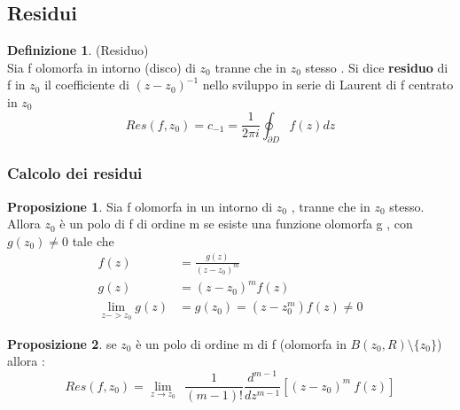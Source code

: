\documentclass{article}
\theoremstyle{definition}
\newtheorem*{definizione}{Definizione}
\newtheorem*{proposizione}{Proposizione}
\begin{document}
\subsection{Residui}
\begin{definizione}(Residuo) \\
	Sia f olomorfa in intorno (disco) di $z_0$ tranne che in $z_0$ stesso . Si dice \textbf{residuo} di f in $z_0$ il coefficiente di $(z-z_0)^{-1}$ nello sviluppo in serie di Laurent di f centrato in $z_0$ 
	$$Res(f,z_0)=c_{-1}=\frac{1}{2 \pi i}\oint_{\partial D}f(z)dz$$
\end{definizione}
	\subsubsection{Calcolo dei residui}
	\begin{tcolorbox}
	\begin{proposizione}
		Sia f olomorfa in un intorno di $z_0$ , tranne che in $z_0$ stesso. Allora $z_0$ è un polo di f di ordine m se esiste una funzione olomorfa g , con $g(z_0)\neq 0$ tale che 
		\begin{align*}
		f(z)&=\frac{g(z)}{(z-z_0)^m} \\
		g(z)&=(z-z_0)^m f(z) \\
		\lim_{z->z_0}g(z)&=g(z_0)=(z-z_0^m)f(z)\neq 0 
	\end{align*}
	\end{proposizione}
\end{tcolorbox}
	\begin{proposizione}
		\item se $z_0$ è un polo di ordine m di f (olomorfa in $B(z_0,R)\setminus \{z_0\}$) allora :  $$Res(f,z_0)=\lim_{z\rightarrow z_0}\ \ \frac{1}{(m-1)!}\frac{d^{m-1}}{dz^{m-1}}\left[(z-z_0)^m \ f(z)\right]$$
	\end{proposizione}
\end{document}
